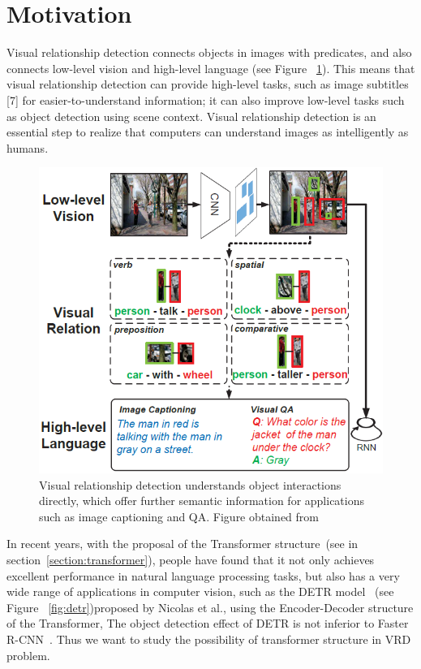\section{Motivation}

Visual relationship detection connects objects in images with predicates, and also connects low-level vision and high-level language (see Figure ~\ref{fig:vrd}). This means that visual relationship detection can provide high-level tasks, such as image subtitles [7] for easier-to-understand information; it can also improve low-level tasks such as object detection using scene context. Visual relationship detection is an essential step to realize that computers can understand images as intelligently as humans.

\begin{figure}[!htbp]
	\centering
	\includegraphics[width = 0.9 \textwidth]{figures/VRD.png}
	\caption[Connection between low-level vision and high-level vision]
	{ Visual relationship detection understands object interactions directly, which offer further semantic information for applications such as image captioning and QA. Figure obtained from ~\cite{zhang2017visual}}
	\label{fig:vrd}
\end{figure}

In recent years, with the proposal of the Transformer structure~\cite{vaswani2017attention}(see in section~\ref{section:transformer}), people have found that it not only achieves excellent performance in natural language processing tasks, but also has a very wide range of applications in computer vision, such as the DETR model~\cite{carion2020end} (see Figure ~\ref{fig:detr})proposed by Nicolas et al., using the Encoder-Decoder structure of the Transformer, The object detection effect of DETR is not inferior to Faster R-CNN~\cite{ren2016faster}. Thus we want to study the possibility of transformer structure in VRD problem.

